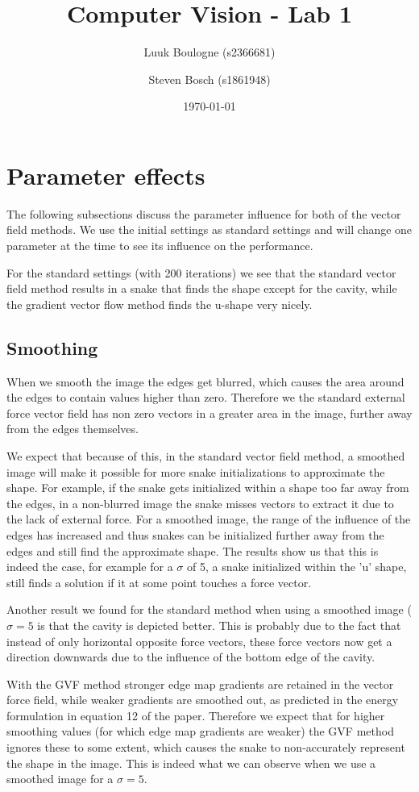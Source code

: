 \documentclass{article}
\title{Computer Vision - Lab 1}
\author{Luuk Boulogne (s2366681) \and Steven Bosch (s1861948)}
\date{\today}
\begin{document}
\maketitle

\section{Parameter effects}
The following subsections discuss the parameter influence for both of the vector field methods. We use the initial settings as standard settings and will change one parameter at the time to see its influence on the performance.

For the standard settings (with 200 iterations) we see that the standard vector field method results in a snake that finds the shape except for the cavity, while the gradient vector flow method finds the u-shape very nicely.

\subsection{Smoothing}
When we smooth the image the edges get blurred, which causes the area around the edges to contain values higher than zero. Therefore we the standard external force vector field has non zero vectors in a greater area in the image, further away from the edges themselves. 

We expect that because of this, in the standard vector field method, a smoothed image will make it possible for more snake initializations to approximate the shape. For example, if the snake gets initialized within a shape too far away from the edges, in a non-blurred image the snake misses vectors to extract it due to the lack of external force. For a smoothed image, the range of the influence of the edges has increased and thus snakes can be initialized further away from the edges and still find the approximate shape. The results show us that this is indeed the case, for example for a $\sigma$ of 5, a snake initialized within the 'u' shape, still finds a solution if it at some point touches a force vector.

Another result we found for the standard method when using a smoothed image ($\sigma = 5$ is that the cavity is depicted better. This is probably due to the fact that instead of only horizontal opposite force vectors, these force vectors now get a direction downwards due to the influence of the bottom edge of the cavity.

With the GVF method stronger edge map gradients are retained in the vector force field, while weaker gradients are smoothed out, as predicted in the energy formulation in equation 12 of the paper. Therefore we expect that for higher smoothing values (for which edge map gradients are weaker) the GVF method ignores these to some extent, which causes the snake to non-accurately represent the shape in the image. This is indeed what we can observe when we use a smoothed image for a $\sigma = 5$.
\end{document}
